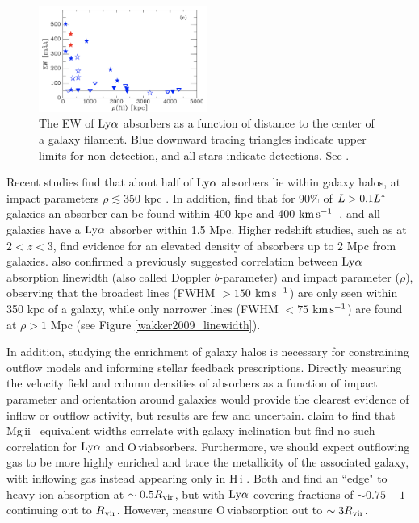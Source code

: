 \documentclass[twocolumn,tighten]{aastex62}
\newcommand{\kms}{$\rm km\, s^{-1}$}
\newcommand{\HI}{\mbox{H\,{\sc i}} }
\newcommand{\II}{\,{\sc ii}}
\newcommand{\VI}{\,{\sc vi}}
\begin{document}
\begin{figure}[ht!]
        \centering
        \vspace{0pt}
        \includegraphics[width=0.49\textwidth]{Wakker2015_filament_EW.png}
        \caption{\small{The EW of $\rm Ly\alpha$ absorbers as a function of distance to the center of a galaxy filament. Blue downward tracing triangles indicate upper limits for non-detection, and all stars indicate detections. See \cite{wakker2015}.}}
        \vspace{5pt}
        \label{wakker_filament}
\end{figure}


Recent studies find that about half of $\rm Ly\alpha$ absorbers lie within galaxy halos, at impact parameters $\rho \lesssim 350$ kpc \citep{cote2005, prochaska2006}. In addition, \cite{wakker2009} find that for 90\% of $L > 0.1 L^{\**}$ galaxies an absorber can be found within 400 kpc and 400 \kms~, and all galaxies have a $\rm Ly\alpha$ absorber within 1.5 Mpc. Higher redshift studies, such as \cite{rudie2012a} at $2 < z < 3$, find evidence for an elevated density of absorbers up to 2 Mpc from galaxies. \cite{wakker2009} also confirmed a previously suggested correlation between $\rm Ly\alpha$ absorption linewidth (also called Doppler $b$-parameter) and impact parameter ($\rho$), observing that the broadest lines (FWHM $>150$ \kms) are only seen within 350 kpc of a galaxy, while only narrower lines (FWHM $<75$ \kms) are found at $\rho > 1$ Mpc (see Figure \ref{wakker2009_linewidth}).

In addition, studying the enrichment of galaxy halos is necessary for constraining outflow models and informing stellar feedback prescriptions. Directly measuring the velocity field and column densities of absorbers as a function of impact parameter and orientation around galaxies would provide the clearest evidence of inflow or outflow activity, but results are few and uncertain. \cite{kacprzak2011_inclination} claim to find that Mg\II~ equivalent widths correlate with galaxy inclination but \cite{mathes2014} find no such correlation for $\rm Ly\alpha$ and O\VI absorbers. Furthermore, we should expect outflowing gas to be more highly enriched and trace the metallicity of the associated galaxy, with inflowing gas instead appearing only in \HI. Both \cite{stocke2013} and \cite{liang2014} find an ``edge" to heavy ion absorption at $\sim 0.5 R_{\rm vir}$, but with $\rm Ly\alpha$ covering fractions of $\sim 0.75 - 1$ continuing out to $R_{\rm vir}$. However, \cite{mathes2014} measure O\VI absorption out to $\sim 3 R_{\rm vir}$.
\end{document}
